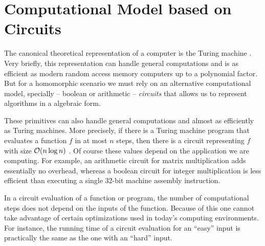 \chapter{Computational Model based on Circuits}\label{chap:circs}
The canonical theoretical representation of a computer is the Turing
machine \cite{Turing01011937}.
Very briefly, this representation can handle general computations and is as
efficient as modern random access memory computers up to a polynomial factor.
But for a homomorphic scenario we must rely on an alternative computational
model, specially -- boolean or arithmetic -- \emph{circuits} that allows us to
represent algorithms in a algebraic form.

These primitives can also handle general computations and almost as efficiently
as Turing machines. More precisely, if there is a Turing machine program that
evaluates a function $f$ in at most $n$ steps, then there is a circuit
representing $f$ with size $\mathcal{O}(n \log n)$ \cite{Pippenger:1979:RCM}. Of
course these values depend on the application we are computing. For
example, an arithmetic circuit for matrix multiplication adds essentially no
overhead, whereas a boolean circuit for integer multiplication is less
efficient than executing a single 32-bit machine assembly instruction.

In a circuit evaluation of a function or program, the number of computational
steps does not depend on the inputs of the function. Because of this one cannot
take advantage of certain optimizations used in today's computing environments.
For instance, the running time of a circuit evaluation for an ``easy'' input is
practically the same as the one with an ``hard'' input.

